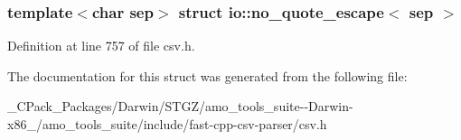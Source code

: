 \subsubsection*{template$<$char sep$>$\newline
struct io\+::no\+\_\+quote\+\_\+escape$<$ sep $>$}



Definition at line 757 of file csv.\+h.



The documentation for this struct was generated from the following file\+:\begin{DoxyCompactItemize}
\item 
\+\_\+\+C\+Pack\+\_\+\+Packages/\+Darwin/\+S\+T\+G\+Z/amo\+\_\+tools\+\_\+suite-\/-\/\+Darwin-\/x86\+\_/amo\+\_\+tools\+\_\+suite/include/fast-\/cpp-\/csv-\/parser/csv.\+h\end{DoxyCompactItemize}
